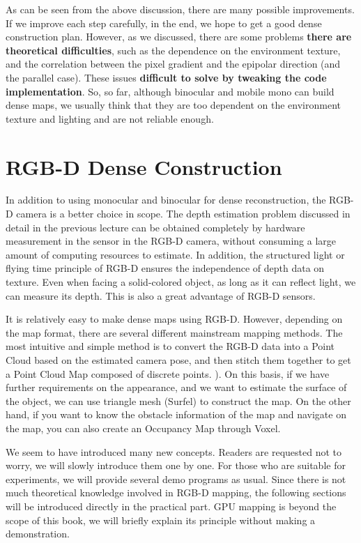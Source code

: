 As can be seen from the above discussion, there are many possible improvements. If we improve each step carefully, in the end, we hope to get a good dense construction plan. However, as we discussed, there are some problems \textbf{there are theoretical difficulties}, such as the dependence on the environment texture, and the correlation between the pixel gradient and the epipolar direction (and the parallel case). These issues \textbf{difficult to solve by tweaking the code implementation}. So, so far, although binocular and mobile mono can build dense maps, we usually think that they are too dependent on the environment texture and lighting and are not reliable enough.

\section{RGB-D Dense Construction}
In addition to using monocular and binocular for dense reconstruction, the RGB-D camera is a better choice in scope. The depth estimation problem discussed in detail in the previous lecture can be obtained completely by hardware measurement in the sensor in the RGB-D camera, without consuming a large amount of computing resources to estimate. In addition, the structured light or flying time principle of RGB-D ensures the independence of depth data on texture. Even when facing a solid-colored object, as long as it can reflect light, we can measure its depth. This is also a great advantage of RGB-D sensors.

It is relatively easy to make dense maps using RGB-D. However, depending on the map format, there are several different mainstream mapping methods. The most intuitive and simple method is to convert the RGB-D data into a Point Cloud based on the estimated camera pose, and then stitch them together to get a Point Cloud Map composed of discrete points. ). On this basis, if we have further requirements on the appearance, and we want to estimate the surface of the object, we can use triangle mesh (Surfel) to construct the map. On the other hand, if you want to know the obstacle information of the map and navigate on the map, you can also create an Occupancy Map through Voxel.

We seem to have introduced many new concepts. Readers are requested not to worry, we will slowly introduce them one by one. For those who are suitable for experiments, we will provide several demo programs as usual. Since there is not much theoretical knowledge involved in RGB-D mapping, the following sections will be introduced directly in the practical part. GPU mapping is beyond the scope of this book, we will briefly explain its principle without making a demonstration.

